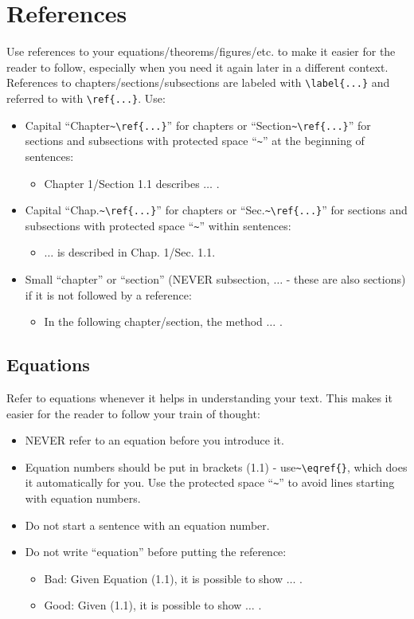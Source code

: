 \section{References}

Use references to your equations/theorems/figures/etc. to make it easier for the reader to follow, especially when you need it again later in a different context.
References to chapters/sections/subsections are labeled with \verb|\label{...}| and referred to with \verb|\ref{...}|. Use: 

\begin{itemize}
	\item Capital ``Chapter\verb|~\ref{...}|'' for chapters or ``Section\verb|~\ref{...}|'' for sections and subsections with protected space ``\verb|~|'' at the beginning of sentences:
	\begin{itemize}
		\item Chapter 1/Section 1.1 describes $\ldots$ .
	\end{itemize}
	\item Capital ``Chap.\verb|~\ref{...}|'' for chapters or ``Sec.\verb|~\ref{...}|'' for sections and subsections with protected space ``\verb|~|'' within sentences:
	\begin{itemize}
		\item $\ldots$ is described in Chap. 1/Sec. 1.1.
	\end{itemize}
	\item Small ``chapter'' or ``section'' (NEVER subsection, $\ldots$ - these are also sections) if it is not followed by a reference:
	\begin{itemize}
		\item In the following chapter/section, the method $\ldots$ .
	\end{itemize}
\end{itemize}

\subsection{Equations}
Refer to equations whenever it helps in understanding your text. This makes it easier for the reader to follow your train of thought:
\begin{itemize}
	\item NEVER refer to an equation before you introduce it. 
	\item Equation numbers should be put in brackets (1.1) - use\verb|~\eqref{}|, which does it automatically for you. Use the protected space ``\verb|~|'' to avoid lines starting with equation numbers.
	\item Do not start a sentence with an equation number.
	\item Do not write ``equation'' before putting the reference:
	\begin{itemize}
		\item Bad: Given Equation (1.1), it is possible to show $\ldots$ .
		\item Good: Given (1.1), it is possible to show $\ldots$ .
	\end{itemize}
\end{itemize}

